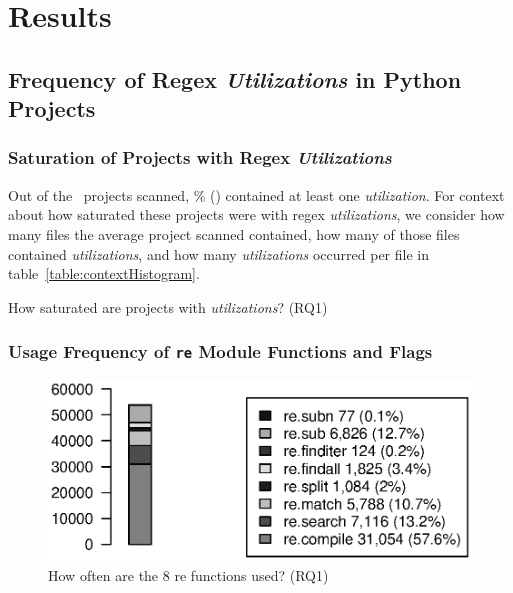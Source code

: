 \section{Results}
\label{sec:results}
\subsection{Frequency of Regex \emph{Utilizations} in Python Projects}
\subsubsection{Saturation of Projects with Regex \emph{Utilizations}}
Out of the \ projects scanned, \% () contained at least one \emph{utilization}.  For context about how saturated these projects were with regex \emph{utilizations}, we consider how many files the average project scanned contained, how many of those files contained \emph{utilizations}, and how many \emph{utilizations} occurred per file in table~\ref{table:contextHistogram}.

\begin{table}[tb]
\caption{How saturated are projects with \emph{utilizations}? (RQ1)}
\label{table:contextHistogram}
\begin{center}

\end{center}
\end{table}

\subsubsection{Usage Frequency of {\tt re} Module Functions and Flags}

\begin{figure}[tb]
\centering
\includegraphics[width=\columnwidth]{../analysis_output/partFunctions.eps}
\caption{How often are the 8 re functions used? (RQ1)}
\label{fig:partFunctions}
\end{figure}

